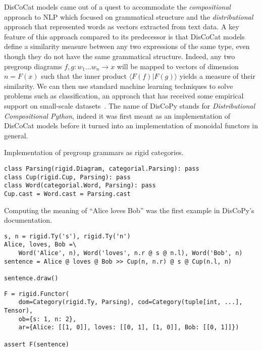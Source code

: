 DisCoCat models came out of a quest to accommodate the \emph{compositional} approach to NLP which focused on grammatical structure and the \emph{distributional} approach that represented words as vectors extracted from text data.
A key feature of this approach compared to its predecessor is that DisCoCat models define a similarity measure between any two expressions of the same type, even though they do not have the same grammatical structure.
Indeed, any two pregroup diagrams $f, g : w_1 \dots w_n \to x$ will be mapped to vectors of dimension $n = F(x)$ such that the inner product $\langle F(f) \vert F(g) \rangle$ yields a measure of their similarity.
We can then use standard machine learning techniques to solve problems such as classification, an approach that has received some empirical support on small-scale datasets~\cite{GrefenstetteSadrzadeh11}.
The name of DisCoPy stands for \emph{Distributional Compositional Python}, indeed it was first meant as an implementation of DisCoCat models before it turned into an implementation of monoidal functors in general.

\begin{python}
{\normalfont Implementation of pregroup grammars as rigid categories.}

\begin{verbatim}
class Parsing(rigid.Diagram, categorial.Parsing): pass
class Cup(rigid.Cup, Parsing): pass
class Word(categorial.Word, Parsing): pass
Cup.cast = Word.cast = Parsing.cast
\end{verbatim}
\end{python}

\begin{example}\label{example:alice-loves-bob}
Computing the meaning of ``Alice loves Bob'' was the first example in DisCoPy's documentation.

\begin{verbatim}
s, n = rigid.Ty('s'), rigid.Ty('n')
Alice, loves, Bob =\
    Word('Alice', n), Word('loves', n.r @ s @ n.l), Word('Bob', n)
sentence = Alice @ loves @ Bob >> Cup(n, n.r) @ s @ Cup(n.l, n)

sentence.draw()
\end{verbatim}


\begin{verbatim}
F = rigid.Functor(
    dom=Category(rigid.Ty, Parsing), cod=Category(tuple[int, ...], Tensor),
    ob={s: 1, n: 2},
    ar={Alice: [[1, 0]], loves: [[0, 1], [1, 0]], Bob: [[0, 1]]})

assert F(sentence)
\end{verbatim}
\end{example}
